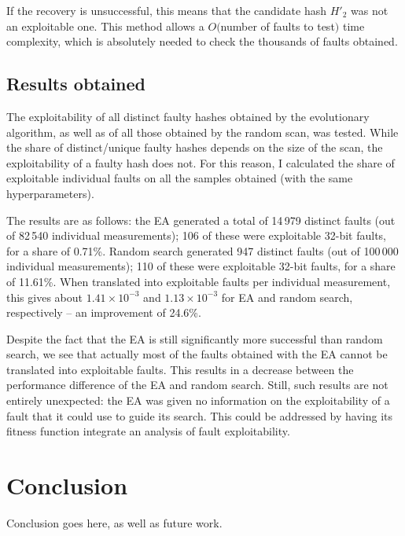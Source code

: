 \documentclass[times, utf8, diplomski]{fer}
\begin{document}
If the recovery is unsuccessful, this means that the candidate hash $H'_2$ was
not an exploitable one. This method allows a $O($number of faults to test$)$
time complexity, which is absolutely needed to check the thousands of faults
obtained.


\section{Results obtained}
The exploitability of all distinct faulty hashes obtained by the evolutionary
algorithm, as well as of all those obtained by the random scan, was tested.
While the share of distinct/unique faulty hashes depends on the size of the scan,
the exploitability of a faulty hash does not. For this reason, I calculated the
share of exploitable individual faults on all the samples obtained (with the
same hyperparameters).


The results are as follows:
the EA generated a total of 14\,979 distinct faults (out of 82\,540 individual
measurements); 106 of these were exploitable 32-bit faults, for a share of 0.71\%.
Random search generated 947 distinct faults (out of 100\,000 individual
measurements); 110 of these were exploitable 32-bit faults, for a share of 11.61\%.
When translated into exploitable faults per individual measurement, this gives
about $1.41 \times 10^{-3}$ and $1.13 \times 10^{-3}$ for EA and random
search, respectively -- an improvement of 24.6\%.

Despite the fact that the EA is still significantly more successful than random search,
we see that actually most of the faults obtained with the EA cannot be translated into
exploitable faults. This results in a decrease between the performance difference
of the EA and random search. Still, such results are not entirely unexpected:
the EA was given no information on the exploitability of a fault that it could
use to guide its search. This could be addressed by having its fitness function
integrate an analysis of fault exploitability.







\chapter{Conclusion}\label{ch:conclusion}
Conclusion goes here, as well as future work.



\end{document}
